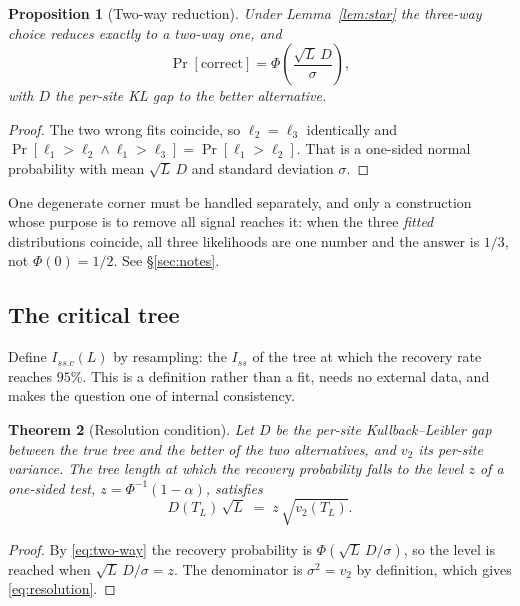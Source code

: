 \documentclass[preprint,12pt,authoryear]{elsarticle}
\newcommand{\Iss}{I_{ss}}
\newcommand{\Issc}{I_{ss.c}}
\newcommand{\TL}{T_L}
\newtheorem{theorem}{Theorem}
\newtheorem{proposition}[theorem]{Proposition}
\theoremstyle{definition}
\theoremstyle{remark}
\begin{document}
\begin{proposition}[Two-way reduction]
\label{prop:two-way}
Under Lemma~\ref{lem:star} the three-way choice reduces \emph{exactly} to a
two-way one, and
\begin{equation}
\Pr[\text{correct}]=\Phi\!\left(\frac{\sqrt L\,D}{\sigma}\right),
\label{eq:two-way}
\end{equation}
with $D$ the per-site KL gap to the better alternative.
\end{proposition}

\begin{proof}
The two wrong fits coincide, so $\ell_2=\ell_3$ identically and
$\Pr[\ell_1>\ell_2\wedge\ell_1>\ell_3]=\Pr[\ell_1>\ell_2]$. That is a
one-sided normal probability with mean $\sqrt L\,D$ and standard
deviation $\sigma$.
\end{proof}

One degenerate corner must be handled separately, and only a construction
whose purpose is to remove all signal reaches it: when the three \emph{fitted}
distributions coincide, all three likelihoods are one number and the answer is
$1/3$, not $\Phi(0)=1/2$. See \S\ref{sec:notes}.

\subsection{The critical tree}
\label{sec:factors}

Define $\Issc(L)$ by resampling: the $\Iss$ of the tree at which the recovery
rate reaches $95\%$. This is a definition rather than a fit, needs no
external data, and makes the question one of internal consistency.


\begin{theorem}[Resolution condition]
\label{thm:resolution}
Let $D$ be the per-site Kullback--Leibler gap between the true tree and
the better of the two alternatives, and $v_2$ its per-site variance. The tree
length at which the recovery probability falls to the level $z$ of a
one-sided test, $z=\Phi^{-1}(1-\alpha)$, satisfies
\begin{equation}
D(\TL)\,\sqrt L \;=\; z\,\sqrt{v_2(\TL)} .
\label{eq:resolution}
\end{equation}
\end{theorem}

\begin{proof}
By \eqref{eq:two-way} the recovery probability is
$\Phi(\sqrt L\,D/\sigma)$, so the level is reached when
$\sqrt L\,D/\sigma=z$. The denominator is
$\sigma^2=v_2$ by definition, which gives \eqref{eq:resolution}.
\end{proof}
\end{document}
